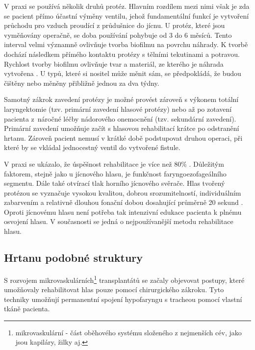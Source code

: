V praxi se používá několik druhů protéz. Hlavním rozdílem mezi nimi však je
zda se pacient přímo účastní výměny ventilu, jehož fundamentální funkcí je
vytvoření průchodu pro vzduch proudící z průdušnice do jícnu. U protéz, které
jsou vyměňovány operačně, se doba používání pohybuje od 3 do 6 měsíců. Tento
interval velmi významně ovlivňuje tvorba biofilmu na povrchu náhrady. K tvorbě
dochází následkem přímého kontaktu protézy s tělními tekutinami a potravou.
Rychlost tvorby biofilmu ovlivňuje tvar a materiál, ze kterého je náhrada
vytvořena \cite{Leunisse2001}. U typů, které si nositel může měnit sám, se
předpokládá, že budou čištěny nebo měněny přibližně jednou za dva týdny.

Samotný zákrok zavedení protézy je možné provést zároveň s výkonem totální
laryngektomie (tzv. primární zavedení hlasové protézy) nebo až po zotavení
pacienta z~náročné léčby nádorového onemocnění (tzv. sekundární zavedení).
Primární zavedení umožňuje začít s hlasovou rehabilitací krátce po odstranění
hrtanu. Zároveň pacient nemusí v krátké době podstupovat druhou operaci, při
které by se vkládal jednocestný ventil do vytvořené fistule.

V praxi se ukázalo, že úspěšnost rehabilitace je více než 80\%
\cite{Slavicek2002}. Důležitým faktorem, stejně jako u jícnového hlasu, je
funkčnost faryngoezofageálního segmentu. Dále také otvírací tlak horního
jícnového svěrače. Hlas tvořený protézou se vyznačuje vysokou kvalitou, dobrou
srozumitelností, individuálním zabarvením a relativně dlouhou fonační dobou
dosahující průměrně 20 sekund \cite{Saito2003}. Oproti jícnovému hlasu není potřeba
tak intenzivní edukace pacienta k plnému osvojení hlasu. V současnosti se
jedná o nejpoužívanější metodu rehabilitace hlasu.




\subsection{Hrtanu podobné struktury} %
\label{sub:cause:tratment:structure}

S rozvojem mikrovaskulárních\footnote{mikrovaskulární - část oběhového systému
složeného z nejmenších cév, jako jsou kapiláry, žilky aj.} transplantátů se
začaly objevovat postupy, které umožňovaly rehabilitovat hlas pouze pomocí
chirurgického zákroku. Tyto techniky umožňují permanentní spojení hypofaryngu
s tracheou pomocí vlastní tkáně pacienta.

